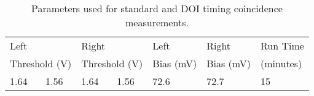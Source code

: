 \begin{table}
\caption{\label{tab:optimumparam} Parameters used for standard and DOI timing coincidence measurements.} 
\begin{tabular}{lllllll}
\hline
\multicolumn{2}{l}{Left} & \multicolumn{2}{l}{Right} & Left & Right & Run Time\\
\multicolumn{2}{l}{Threshold (V)} & \multicolumn{2}{l}{Threshold (V)} & Bias (mV) & Bias (mV) & (minutes)\\
\hline
1.64&  1.56 &  1.64 &  1.56 &  72.6 &  72.7 & 15\\
\hline
\end{tabular}
\end{table}

